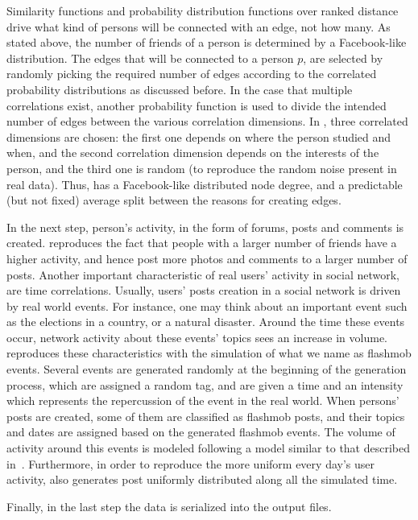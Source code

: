 Similarity functions and probability distribution functions over ranked
distance drive what kind of persons will be connected with an edge, not how
many. As stated above, the number of friends of a person is determined by a
Facebook-like distribution. The edges that will be connected to a person $p$,
are selected by randomly picking the required number of edges according to the
correlated probability distributions as discussed before. In the case that
multiple correlations exist, another probability function is used to divide the
intended number of edges between the various correlation dimensions. In \datagen,
three correlated dimensions are chosen: the first one depends on where the
person studied and when, and the second correlation dimension depends on the
interests of the person, and the third one is random (to reproduce the random
noise present in real data). Thus, \datagen has a Facebook-like distributed node
degree, and a predictable (but not fixed) average split between the reasons for
creating edges.

In the next step, person's activity, in the form of forums, posts and comments
is created. \datagen reproduces the fact that people with a larger number of
friends have a higher activity, and hence post more photos and comments to a
larger number of posts. Another important characteristic of real users'
activity in social network, are time correlations.  Usually, users' posts
creation in a social network is driven by real world events.  For
instance, one may think about an important event such as the elections in a
country, or a natural disaster. Around the time these events occur, network
activity about these events' topics sees an increase in volume. \datagen
reproduces these characteristics with the simulation of what we name as
flashmob events.  Several events are generated randomly at the beginning of the
generation process, which are assigned a random tag, and are given a time and
an intensity which represents the repercussion of the event in the real world.
When persons' posts are created, some of them are classified as flashmob posts,
and their topics and dates are assigned based on the generated flashmob events.
The volume of activity around this events is modeled following a model similar
to that described in~\cite{DBLP:conf/kdd/LeskovecBKT08}. Furthermore, in order to reproduce the
more uniform every day's user activity, \datagen also generates post uniformly
distributed along all the simulated time.

Finally, in the last step the data is serialized into the output files.

